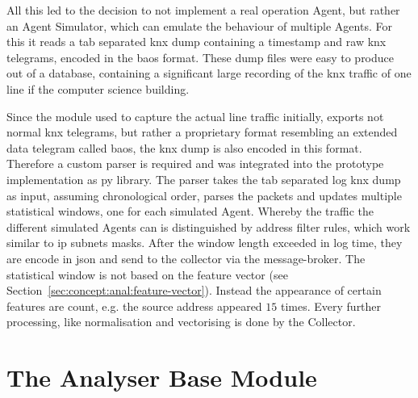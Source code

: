 All this led to the decision to not implement a real operation Agent, but rather an Agent Simulator, which can emulate the behaviour of multiple Agents.
For this it reads a tab separated \gls{knx} dump containing a timestamp and raw \gls{knx} telegrams, encoded in the \gls{baos} format.
These dump files were easy to produce out of a database, containing a significant large recording of the \gls{knx} traffic of one line if the computer science building.

Since the module used to capture the actual line traffic initially, exports not normal \gls{knx} telegrams, but rather a proprietary format resembling an extended data telegram called \gls{baos}, the \gls{knx} dump is also encoded in this format.
Therefore a custom parser is required and was integrated into the prototype implementation as \gls{py} library.
The parser takes the tab separated log \gls{knx} dump as input, assuming chronological order, parses the packets and updates multiple statistical windows, one for each simulated Agent. Whereby the traffic the different simulated Agents can is distinguished by address filter rules, which work similar to \gls{ip} subnets masks. 
After the window length exceeded in log time, they are encode in \gls{json} and send to the collector via the message-broker.
The statistical window is not based on the feature vector (see Section~\ref{sec:concept:anal:feature-vector}). Instead the appearance of certain features are count, e.g. the source address  appeared $15$ times.
Every further processing, like normalisation and vectorising is done by the Collector. 

\section{The Analyser Base Module}
\label{sec:impl:base}

